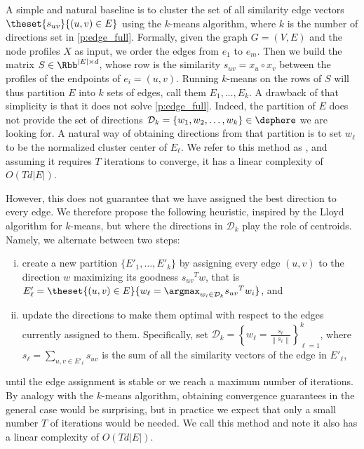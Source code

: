 A simple and natural baseline is to cluster the set of all similarity edge vectors $
\theset{s_{uv}}{(u,v) \in E}$ using the $k$-means algorithm, where $k$ is the number of directions
set in \autoref{p:edge_full}. Formally, given the graph $G=(V,E)$ and the node profiles $X$ as
input, we order the edges from $e_1$ to $e_m$. Then we build the matrix $S \in \Rbb^{|E|\times d}$, whose
\ith{} row is the similarity $s_{uv} = x_u \circ x_v$ between the profiles of the endpoints of $e_i=(u,v)$.
Running $k$-means on the rows of $S$ will thus partition $E$ into $k$ sets of edges, call them $E_1,
\ldots, E_k$. A drawback of that simplicity is that it does not solve \autoref{p:edge_full}.
Indeed, the partition of $E$ does not provide the set of directions $\mathcal{D}_k = \{w_1, w_2,
\ldots, w_k\} \in \dsphere$ we are looking for. A natural way of obtaining directions from that
partition is to set $w_\ell$ to be the normalized cluster center of $E_\ell$. We refer to this
method as \kmeans{}, and assuming it requires $T$ iterations to converge, it has a linear complexity
of $O(Td|E|)$.
\iffalse
\begin{center}
  \rule{\textwidth}{.3pt}
  \begin{algorithmic}[1]
    \Function{\kmeans{}}{graph $G=(V,E=\{e_1, \ldots, e_m \})$, profiles $X$}
    \State build the matrix $S$ such that $S_{i,j} = {s_{e_i}}_{;j}$
    \State let $\yhat{}$ and $\{c_1, \ldots, c_k\}$ be the assignment and centroids resulting of
    running $k$-means on the rows of $S$
    \State \textbf{return} \yhat{}, $\mathcal{D}_k = \left\{\frac{c_\ell}{\left\| c_\ell
    \right\|}\right\}_{\ell=1}^k $
    \EndFunction
  \end{algorithmic}
  \rule{\textwidth}{.3pt}
\end{center}
\fi

However,
this does not guarantee that we have assigned the best direction to every edge. We therefore propose
the following heuristic, inspired by the Lloyd algorithm for $k$-means, but where the directions in
$\mathcal{D}_k$ play the role of centroids. Namely, we alternate between two steps:
\begin{enumerate}[(i), nosep]
  \item create a new partition $\{E'_1, \ldots, E'_k\}$ by assigning every edge $(u,v)$ to the
    direction $w$ maximizing its goodness ${s_{uv}}^T w$, that is $E'_\ell = \theset{(u,v) \in E}{
    w_\ell = \argmax_{w_i \in \mathcal{D}_k} {s_{uv}}^T w_i}$, and
  \item update the directions to make them optimal with respect to the edges currently assigned to
    them. Specifically, set $\mathcal{D}_k = \left\{ w_\ell = \frac{s_\ell}{\left\| s_\ell
    \right\|}\right\}_{\ell=1}^k $, where $s_\ell = \sum_{u,v \in E'_\ell} s_{uv}$ is the sum of all
    the similarity vectors of the edge in $E'_\ell$,
\end{enumerate}
until the edge assignment is stable or we reach a maximum number of iterations. By analogy with the
$k$-means algorithm, obtaining convergence guarantees in the general case would be surprising, but in
practice we expect that only a small number $T$ of iterations would be needed. We call this method
\lloyd{} and note it also has a linear complexity of $O(Td|E|)$.

